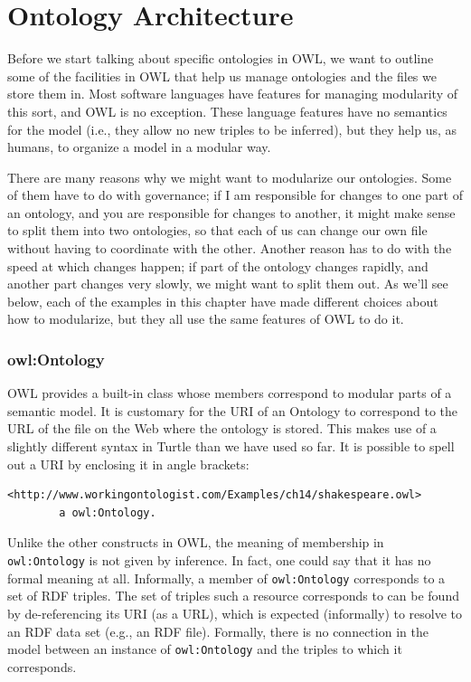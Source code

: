 \section{Ontology Architecture}

Before we start talking about specific ontologies in OWL, we want to 
outline some of the facilities in OWL that help us manage ontologies and
the files we store them in.     Most software languages
have features for managing modularity of this sort, and OWL is no
exception.
These language features have no semantics for the model (i.e., they allow no
new triples to be inferred), but they help us, as humans, to organize a
model in a modular way.

There are many reasons why we might want to 
modularize our ontologies.  Some of them have to do with governance; if
I am responsible for changes to one part of an ontology, and you are 
responsible for changes to another, it might make sense to split them 
into two ontologies, so that each of us can change our own file without 
having to coordinate with the other.   Another reason has to do with 
the speed at which changes happen; if part of the ontology changes rapidly, 
and another part changes very slowly, we might want to split them out. 
As we'll see below, each of the examples in this chapter have made different
choices about how to modularize, but they all use the same features of OWL
to do it.  


\subsubsection{owl:Ontology}

OWL provides a built-in class whose members correspond to modular parts
of a semantic model. It is customary for the URI of an Ontology to
correspond to the URL of the file on the Web where the ontology is
stored. This makes use of a slightly different syntax in Turtle than we
have used so far. It is possible to spell out a URI by enclosing it in
angle brackets:

\begin{lstlisting}
<http://www.workingontologist.com/Examples/ch14/shakespeare.owl>
        a owl:Ontology.
\end{lstlisting}

Unlike the other constructs in OWL, the meaning of membership in
\texttt{owl:Ontology} is not given by inference. In fact, one could say that it
has no formal meaning at all. Informally, a member of \texttt{owl:Ontology}
corresponds to a set of RDF triples. The set of triples such a resource
corresponds to can be found by de-referencing its URI (as a URL), which
is expected (informally) to resolve to an RDF data set (e.g., an RDF
file). Formally, there is no connection in the model between an instance
of \texttt{owl:Ontology} and the triples to which it corresponds.

